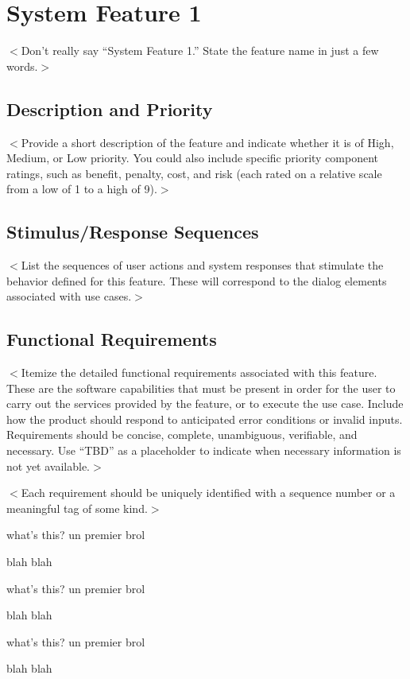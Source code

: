 \documentclass{scrreprt}
\begin{document}
\section{System Feature 1}
$<$Don’t really say “System Feature 1.” State the feature name in just a few 
words.$>$

\subsection{Description and Priority}
$<$Provide a short description of the feature and indicate whether it is of 
High, Medium, or Low priority. You could also include specific priority 
component ratings, such as benefit, penalty, cost, and risk (each rated on a 
relative scale from a low of 1 to a high of 9).$>$

\subsection{Stimulus/Response Sequences}
$<$List the sequences of user actions and system responses that stimulate the 
behavior defined for this feature. These will correspond to the dialog elements 
associated with use cases.$>$

\subsection{Functional Requirements}
$<$Itemize the detailed functional requirements associated with this feature.  
These are the software capabilities that must be present in order for the user 
to carry out the services provided by the feature, or to execute the use case.  
Include how the product should respond to anticipated error conditions or 
invalid inputs. Requirements should be concise, complete, unambiguous, 
verifiable, and necessary. Use “TBD” as a placeholder to indicate when necessary 
information is not yet available.$>$

$<$Each requirement should be uniquely identified with a sequence number or a 
meaningful tag of some kind.$>$


\begin{reqmt}[FOOREQMT-1]
  \label{req:fooreqmt}
  {what's this?}  un premier brol

  blah blah
\end{reqmt}




\begin{reqmt}[FOOREQMT-2]
  \label{req:fooreqmt2}
  {what's this?}  un premier brol

  blah blah
\end{reqmt}
\begin{reqmt}[FOOREQMT-3]
  \label{req:fooreqmt3}
  {what's this?}  un premier brol

  blah blah
\end{reqmt}
\end{document}
